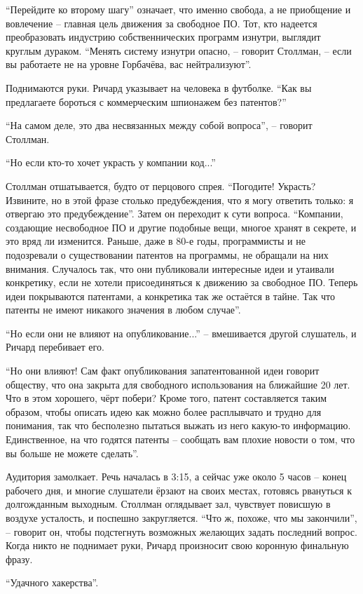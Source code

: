 \enquote{Перейдите ко второму шагу} означает, что именно свобода, а не приобщение и вовлечение -- главная цель движения за свободное ПО. Тот, кто надеется преобразовать индустрию собственнических программ изнутри, выглядит круглым дураком. \enquote{Менять систему изнутри опасно, -- говорит Столлман, -- если вы работаете не на уровне Горбачёва, вас нейтрализуют}.

Поднимаются руки. Ричард указывает на человека в футболке. \enquote{Как вы предлагаете бороться с коммерческим шпионажем без патентов?}

\enquote{На самом деле, это два несвязанных между собой вопроса}, -- говорит Столлман.

\enquote{Но если кто-то хочет украсть у компании код...}

Столлман отшатывается, будто от перцового спрея. \enquote{Погодите! Украсть? Извините, но в этой фразе столько предубеждения, что я могу ответить только: я отвергаю это предубеждение}. Затем он переходит к сути вопроса. \enquote{Компании, создающие несвободное ПО и другие подобные вещи, многое хранят в секрете, и это вряд ли изменится. Раньше, даже в 80-е годы, программисты и не подозревали о существовании патентов на программы, не обращали на них внимания. Случалось так, что они публиковали интересные идеи и утаивали конкретику, если не хотели присоединяться к движению за свободное ПО. Теперь идеи покрываются патентами, а конкретика так же остаётся в тайне. Так что патенты не имеют никакого значения в любом случае}.

\enquote{Но если они не влияют на опубликование...} -- вмешивается другой слушатель, и Ричард перебивает его.

\enquote{Но они влияют! Сам факт опубликования запатентованной идеи говорит обществу, что она закрыта для свободного использования на ближайшие 20 лет. Что в этом хорошего, чёрт побери? Кроме того, патент составляется таким образом, чтобы описать идею как можно более расплывчато и трудно для понимания, так что бесполезно пытаться выжать из него какую-то информацию. Единственное, на что годятся патенты -- сообщать вам плохие новости о том, что вы больше не можете сделать}.

Аудитория замолкает. Речь началась в 3:15, а сейчас уже около 5 часов -- конец рабочего дня, и многие слушатели ёрзают на своих местах, готовясь рвануться к долгожданным выходным. Столлман оглядывает зал, чувствует повисшую в воздухе усталость, и поспешно закругляется. \enquote{Что ж, похоже, что мы закончили}, -- говорит он, чтобы подстегнуть возможных желающих задать последний вопрос. Когда никто не поднимает руки, Ричард произносит свою коронную финальную фразу.

\enquote{Удачного хакерства}.
